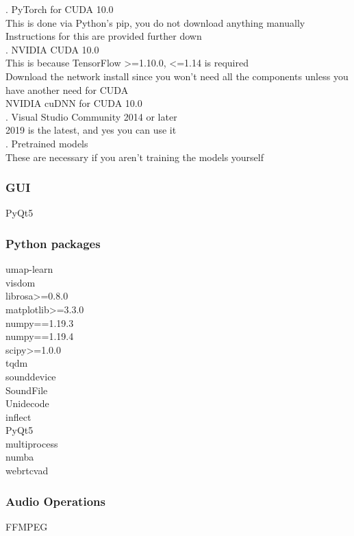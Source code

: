 \documentclass[12pt]{report}
\begin{document}
. PyTorch for CUDA 10.0\\
This is done via Python’s pip, you do not download anything manually\\
Instructions for this are provided further down\\

. NVIDIA CUDA 10.0\\
This is because TensorFlow >=1.10.0, <=1.14 is required\\
Download the network install since you won’t need all the components unless you have another need for CUDA\\
NVIDIA cuDNN for CUDA 10.0\\

. Visual Studio Community 2014 or later\\
2019 is the latest, and yes you can use it\\

. Pretrained models\\
These are necessary if you aren’t training the models yourself
\subsubsection{GUI} PyQt5 \\
\subsubsection{Python packages} umap-learn\\
visdom\\
librosa>=0.8.0\\
matplotlib>=3.3.0\\
numpy==1.19.3\\
numpy==1.19.4\\ 
scipy>=1.0.0\\
tqdm\\
sounddevice\\
SoundFile\\
Unidecode\\
inflect\\
PyQt5\\
multiprocess\\
numba\\
webrtcvad\\
\subsubsection{Audio Operations} FFMPEG\\
\end{document}
